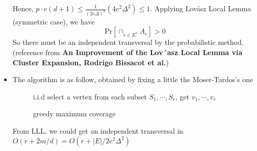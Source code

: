\documentclass[12pt]{article}
\newenvironment{solution}[2][Solution]{\begin{trivlist}
\item[\hskip \labelsep {\bfseries #1}\hskip \labelsep {\bfseries #2.}]}{\end{trivlist}}
\begin{document}
\begin{solution}{1}
\begin{itemize}
        Hence, $p\cdot e(d+1) \le \frac{1}{(2e\Delta)^2}(4e^2\Delta^2) \le 1$.
        Applying Lovász Local Lemma (symmetric case), we have
        \[\mathrm{Pr}[\cap_{e\in E^*}\overline{A_e}] > 0\]
        So there must be an independent transversal by the probabilistic method.
        (reference from \textbf{An Improvement of the Lov´asz Local Lemma via Cluster Expansion, Rodrigo Bissacot et al.})
        \item The algorithm is as follow, obtained by fixing a little the Moser-Tardos's one
        \\[60pt]
        \begin{figure}[ht]
            \centering
            \begin{minipage}{.7\linewidth}
        \begin{algorithm}[H]
            \caption{greedy maximum coverage}
            i.i.d select a vertex from each subset $S_1, \cdots, S_r$, get $v_1, \cdots, v_r$ \;
        \end{algorithm}
    \end{minipage}
\end{figure}

        From LLL, we could get an independent transversal in $O(r+2m/d) = O(r+|E|/2e^2\Delta^2)$
    \end{itemize}
\end{solution}
\end{document}
